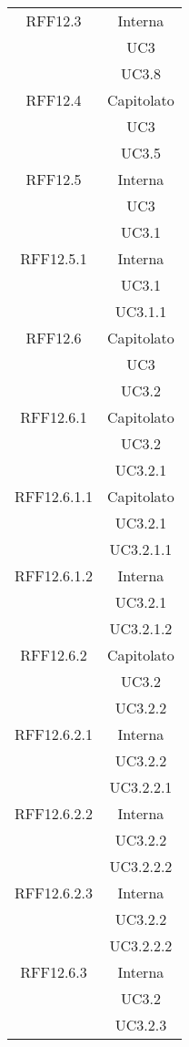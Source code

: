 \begin{longtable}{|c|c|}
\midrule
RFF12.3
& Interna\\
& UC3\\
& UC3.8\\

\midrule
RFF12.4
& Capitolato\\
& UC3\\
& UC3.5\\

\midrule
RFF12.5
& Interna\\
& UC3\\
& UC3.1\\

\midrule
RFF12.5.1
& Interna\\
& UC3.1\\
& UC3.1.1\\

\midrule
RFF12.6
& Capitolato\\
& UC3\\
& UC3.2\\

\midrule
RFF12.6.1
& Capitolato\\
& UC3.2\\
& UC3.2.1\\

\midrule
RFF12.6.1.1
& Capitolato\\
& UC3.2.1\\
& UC3.2.1.1\\

\midrule
RFF12.6.1.2
& Interna\\
& UC3.2.1\\
& UC3.2.1.2\\

\midrule
RFF12.6.2
& Capitolato\\
& UC3.2\\
& UC3.2.2\\

\midrule
RFF12.6.2.1
& Interna\\
& UC3.2.2\\
& UC3.2.2.1\\

\midrule
RFF12.6.2.2
& Interna\\
& UC3.2.2\\
& UC3.2.2.2\\

\midrule
RFF12.6.2.3
& Interna\\
& UC3.2.2\\
& UC3.2.2.2\\

\midrule
RFF12.6.3
& Interna\\
& UC3.2\\
& UC3.2.3\\


\end{longtable}
